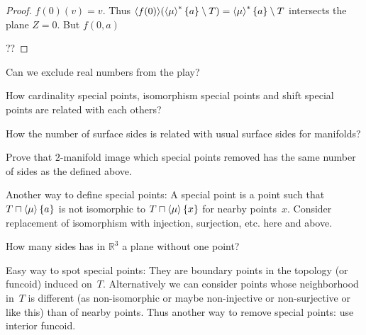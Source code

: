 \begin{proof}
$f (0) (v) = v$. Thus $\langle f (0) \rangle (\left\langle \mu\right\rangle ^{\ast} \{ a
\} \setminus T) = \left\langle \mu\right\rangle ^{\ast} \{ a \} \setminus T$ intersects
the plane $Z = 0$. But $f (0, a)$

??
\end{proof}

\begin{question}
Can we exclude real numbers from the play?
\end{question}

\begin{question}
How cardinality special points, isomorphism special points and shift
special points are related with each others?
\end{question}

\begin{question}
How the number of surface sides is related with usual surface sides for
manifolds?
\end{question}

Prove that $2$-manifold image which special points removed has the same number
of sides as the defined above.

Another way to define special points: A special point is a point
such that $T\sqcap\left\langle \mu\right\rangle\{a\}$ is not isomorphic to
$T\sqcap\left\langle \mu\right\rangle\{x\}$ for nearby points~$x$. Consider replacement
of isomorphism with injection, surjection, etc. here and above.

How many sides has in $\mathbb{R}^3$ a plane without one point?

Easy way to spot special points: They are boundary points in the
topology (or funcoid) induced on~$T$. Alternatively we can consider
points whose neighborhood in~$T$ is different (as non-isomorphic or
maybe non-injective or non-surjective or like this) than of nearby
points. Thus another way to remove special points: use interior funcoid.
